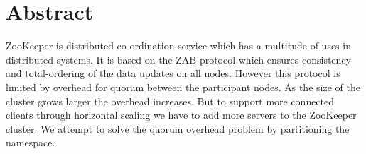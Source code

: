 \chapter{Abstract}
ZooKeeper is distributed co-ordination service which has a multitude of uses in distributed systems. It is based on the ZAB protocol which ensures consistency and total-ordering of the data updates on all nodes. However this protocol is limited by overhead for quorum between the participant nodes. As the size of the cluster grows larger the overhead increases. But to support more connected clients through horizontal scaling we have to add more servers to the ZooKeeper cluster. We attempt to solve the quorum overhead problem by partitioning the namespace.
